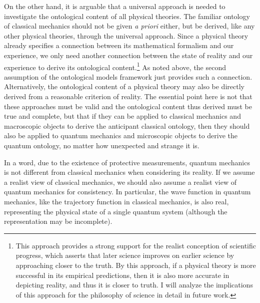 On the other hand, it is arguable that a universal approach is needed to investigate the ontological content of all physical theories.
The familiar ontology of classical mechanics should not be given \emph{a priori} either, but be derived, like any other physical theories, through the universal approach.
Since a physical theory already specifies a connection between its mathematical formalism and our experience, we only need another connection between the state of reality and our experience to derive its ontological content.\footnote{This approach provides a strong support for the realist conception of scientific progress, which asserts that later science improves on earlier science by approaching closer to the truth. 
By this approach, if a physical theory is more successful in its empirical predictions, then it is also more accurate in depicting reality, and thus it is closer to truth. I will analyze the implications of this approach for the philosophy of science in detail in future work.} 
As noted above, the second assumption of the ontological models framework just provides such a connection.
Alternatively, the ontological content of a physical theory may also be directly derived from a reasonable criterion of reality. %
The essential point here is not that these approaches must be valid and the ontological content thus derived must be true and complete, but that if they can be applied to classical mechanics and macroscopic objects to derive the anticipant classical ontology, then they should also be applied  to quantum mechanics and microscopic objects to derive the quantum ontology, no matter how unexpected and strange it is.


In a word, due to the existence of protective measurements, quantum mechanics is not different from classical mechanics when considering its reality. If we assume a realist view of classical mechanics, we should also assume a realist view of quantum mechanics for consistency. In particular, the wave function in quantum mechanics, like the trajectory function in classical mechanics, is also real, representing the physical state of a single quantum system (although the representation may be incomplete).

